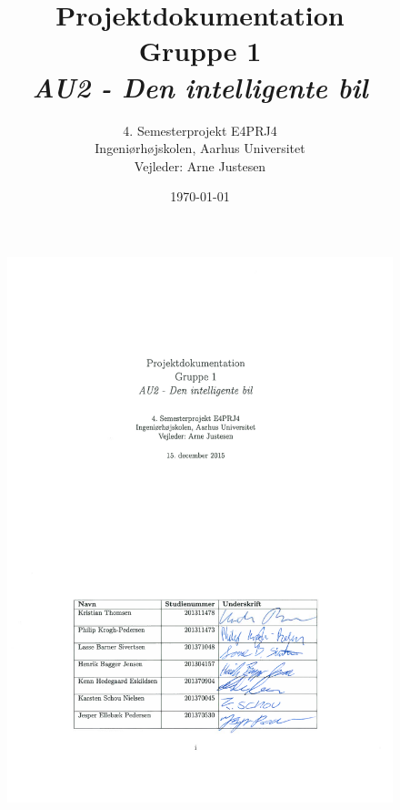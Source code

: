 \documentclass[a4paper,11pt,twoside,openright]{memoir}
\title{Projektdokumentation \\ Gruppe 1 \\ \textit{AU2 - Den intelligente bil }}
\author{4. Semesterprojekt E4PRJ4 \\ Ingeniørhøjskolen, Aarhus Universitet\\ Vejleder: Arne Justesen}
\date{\today}
\begin{document}
\fancyhf{} %
\frontmatter
\maketitle
\vfill

\begin{figure}
\centering
\includegraphics[scale=1, trim=90 100 90 450, clip=true]{../fig/forside_dokumentation_underskrevet}
\end{figure}
\end{document}

